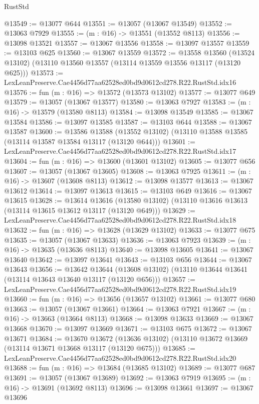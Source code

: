 \begin{lexlean}{RustStd}
\begin{coremodule}
@13549 := @13077 @644
@13551 := @13057 (@13067 @13549)
@13552 := @13063 @7929
@13555 := (m : @16) -> @13551 (@13552 @8113)
@13556 := @13098 @13521
@13557 := @13067 @13556
@13558 := @13097 @13557
@13559 := @13103 @625
@13560 := @13067 @13559
@13572 := @13558
    @13560
    (@13524 @13102)
    (@13110 @13560 @13557 (@13114 @13559 @13556 @13117 (@13120 @625)))
@13573 := LexLeanPreserve.Cae4456d77aa62528ed0bd9d0612cd278.R22.RustStd.idx16
@13576 := fun (m : @16) => @13572 (@13573 @13102)
@13577 := @13077 @649
@13579 := @13057 (@13067 @13577)
@13580 := @13063 @7927
@13583 := (m : @16) -> @13579 (@13580 @8113)
@13584 := @13098 @13549
@13585 := @13067 @13584
@13586 := @13097 @13585
@13587 := @13103 @644
@13588 := @13067 @13587
@13600 := @13586
    @13588
    (@13552 @13102)
    (@13110 @13588 @13585 (@13114 @13587 @13584 @13117 (@13120 @644)))
@13601 := LexLeanPreserve.Cae4456d77aa62528ed0bd9d0612cd278.R22.RustStd.idx17
@13604 := fun (m : @16) => @13600 (@13601 @13102)
@13605 := @13077 @656
@13607 := @13057 (@13067 @13605)
@13608 := @13063 @7925
@13611 := (m : @16) -> @13607 (@13608 @8113)
@13612 := @13098 @13577
@13613 := @13067 @13612
@13614 := @13097 @13613
@13615 := @13103 @649
@13616 := @13067 @13615
@13628 := @13614
    @13616
    (@13580 @13102)
    (@13110 @13616 @13613 (@13114 @13615 @13612 @13117 (@13120 @649)))
@13629 := LexLeanPreserve.Cae4456d77aa62528ed0bd9d0612cd278.R22.RustStd.idx18
@13632 := fun (m : @16) => @13628 (@13629 @13102)
@13633 := @13077 @675
@13635 := @13057 (@13067 @13633)
@13636 := @13063 @7923
@13639 := (m : @16) -> @13635 (@13636 @8113)
@13640 := @13098 @13605
@13641 := @13067 @13640
@13642 := @13097 @13641
@13643 := @13103 @656
@13644 := @13067 @13643
@13656 := @13642
    @13644
    (@13608 @13102)
    (@13110 @13644 @13641 (@13114 @13643 @13640 @13117 (@13120 @656)))
@13657 := LexLeanPreserve.Cae4456d77aa62528ed0bd9d0612cd278.R22.RustStd.idx19
@13660 := fun (m : @16) => @13656 (@13657 @13102)
@13661 := @13077 @680
@13663 := @13057 (@13067 @13661)
@13664 := @13063 @7921
@13667 := (m : @16) -> @13663 (@13664 @8113)
@13668 := @13098 @13633
@13669 := @13067 @13668
@13670 := @13097 @13669
@13671 := @13103 @675
@13672 := @13067 @13671
@13684 := @13670
    @13672
    (@13636 @13102)
    (@13110 @13672 @13669 (@13114 @13671 @13668 @13117 (@13120 @675)))
@13685 := LexLeanPreserve.Cae4456d77aa62528ed0bd9d0612cd278.R22.RustStd.idx20
@13688 := fun (m : @16) => @13684 (@13685 @13102)
@13689 := @13077 @687
@13691 := @13057 (@13067 @13689)
@13692 := @13063 @7919
@13695 := (m : @16) -> @13691 (@13692 @8113)
@13696 := @13098 @13661
@13697 := @13067 @13696

\end{coremodule}
\end{lexlean}
